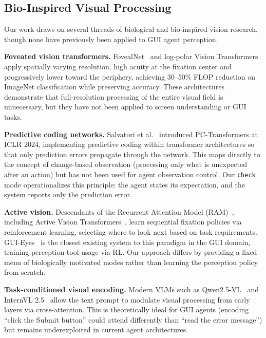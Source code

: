 \documentclass[11pt,a4paper]{article}
\begin{document}
\subsection{Bio-Inspired Visual Processing}
\label{sec:rw-bio-inspired}

Our work draws on several threads of biological and bio-inspired vision research, though none have previously been applied to GUI agent perception.

\textbf{Foveated vision transformers.} FovealNet~\cite{fovealnet} and log-polar Vision Transformers~\cite{logpolar-vit} apply spatially varying resolution, high acuity at the fixation center and progressively lower toward the periphery, achieving 30--50\% FLOP reduction on ImageNet classification while preserving accuracy. These architectures demonstrate that full-resolution processing of the entire visual field is unnecessary, but they have not been applied to screen understanding or GUI tasks.

\textbf{Predictive coding networks.} Salvatori et al.~\cite{salvatori-pctransformers} introduced PC-Transformers at ICLR 2024, implementing predictive coding within transformer architectures so that only prediction errors propagate through the network. This maps directly to the concept of change-based observation (processing only what is unexpected after an action) but has not been used for agent observation control. Our \texttt{check} mode operationalizes this principle: the agent states its expectation, and the system reports only the prediction error.

\textbf{Active vision.} Descendants of the Recurrent Attention Model (RAM)~\cite{mnih-ram}, including Active Vision Transformers~\cite{active-vit}, learn sequential fixation policies via reinforcement learning, selecting where to look next based on task requirements. GUI-Eyes~\cite{gui-eyes} is the closest existing system to this paradigm in the GUI domain, training perception-tool usage via RL. Our approach differs by providing a fixed menu of biologically motivated modes rather than learning the perception policy from scratch.

\textbf{Task-conditioned visual encoding.} Modern VLMs such as Qwen2.5-VL~\cite{qwen25-vl} and InternVL 2.5~\cite{internvl-25} allow the text prompt to modulate visual processing from early layers via cross-attention. This is theoretically ideal for GUI agents (encoding ``click the Submit button'' could attend differently than ``read the error message'') but remains underexploited in current agent architectures.
\end{document}
